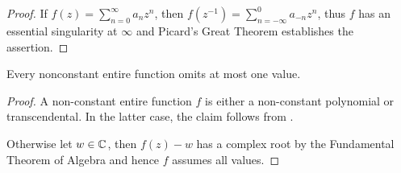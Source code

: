 \begin{proof}
    If $f(z) = \sum_{n=0}^\infty a_n z^n$, then $f(z^{-1}) = \sum_{n=-\infty}^0 a_{-n} z^{n}$, thus $f$ has an essential singularity at $\infty$ and Picard's Great Theorem establishes the assertion.
\end{proof}

\begin{corollary} \label{thm:picards-little-theorem}
    Every nonconstant entire function omits at most one value.
\end{corollary}

\begin{proof}
    A non-constant entire function $f$ is either a non-constant polynomial or transcendental. In the latter case, the claim follows from .
    
    Otherwise let $w \in \mathbb{C}$, then $f(z) - w$ has a complex root by the Fundamental Theorem of Algebra and hence $f$ assumes all values.
\end{proof}